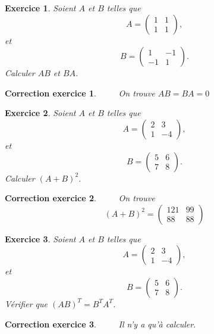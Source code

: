 \documentclass[12pt]{article}
\newtheorem{exercice}{\bf Exercice}
\newtheorem{correction}{\bf Correction exercice}
\newenvironment{exo}{
\begin{exercice}\smallskip\normalfont}{\end{exercice}
}
\newenvironment{cor}{
\begin{correction}\smallskip\normalfont}{\end{correction}
}
\newif\ifcorrige\corrigetrue
\begin{document}
\color{black}
\fi
\begin{exo}
Soient $A$ et $B$ telles que
 $$A=\left ( \begin{array}{cc} 1&1\\1&1    \end{array}     \right),$$
 et
 $$B=\left ( \begin{array}{cc} 1&-1\\-1&1    \end{array}     \right).$$
 Calculer $AB$ et $BA$.
\end{exo}
\ifcorrige
\color{magenta}
\begin{cor}
  $\qquad$ On trouve $AB=BA=0$
  
    \end{cor}
\color{black}
\fi
\begin{exo}
Soient $A$ et $B$ telles que
 $$A=\left ( \begin{array}{cc} 2&3\\1&-4    \end{array}     \right),$$
 et
 $$B=\left ( \begin{array}{cc} 5&6\\7&8    \end{array}     \right).$$
 Calculer $(A+B)^2$.
\end{exo}
\ifcorrige
\color{magenta}
\begin{cor}
  $\qquad$ On trouve 
  $$(A+B)^2=\left ( \begin{array}{cc} 121&99\\88&88    \end{array}     \right)  $$
  
    \end{cor}
\color{black}
\fi
\begin{exo}
Soient $A$ et $B$ telles que
 $$A=\left ( \begin{array}{cc} 2&3\\1&-4    \end{array}     \right),$$
 et
 $$B=\left ( \begin{array}{cc} 5&6\\7&8    \end{array}     \right).$$
 V\'erifier que $(AB)^T=B^TA^T$.
\end{exo}
\ifcorrige
\color{magenta}
\begin{cor}
  $\qquad$ Il n'y a qu'\`a calculer.
\end{cor}
\color{black}
\fi
\end{document}
